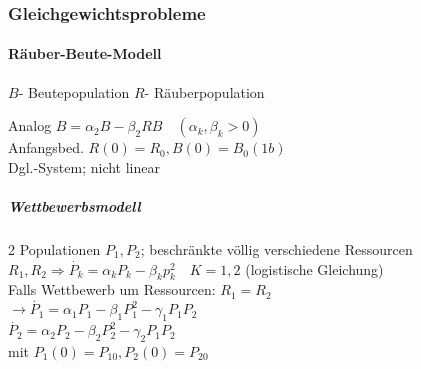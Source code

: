 \documentclass[a4paper]{scrartcl}
\begin{document}
\subsubsection{Gleichgewichtsprobleme}
\paragraph{Räuber-Beute-Modell}
$B$- Beutepopulation
$R$- Räuberpopulation


Analog $B= \alpha_2 B - \beta_2 RB  \quad (\alpha_k,\beta_k > 0)$\\
Anfangsbed. $R(0) = R_0 , B(0) = B_0 (1b)$\\
Dgl.-System; nicht linear
\subparagraph{Wettbewerbsmodell}
2 Populationen $P_1,P_2$; beschränkte völlig verschiedene Ressourcen $R_1,R_2 \Rightarrow \dot{P_k} = \alpha_k P_k - \beta_k p_k^2 \quad K=1,2$ (logistische Gleichung)\\
Falls Wettbewerb um Ressourcen: $R_1 = R_2$\\
$\rightarrow \dot{P_1} = \alpha_1 P_1 - \beta_1 P_1^2 - \gamma_1 P_1 P_2$\\
$\dot{P_2} = \alpha_2 P_2 - \beta_2 P_2^2 - \gamma_2 P_1 P_2$\\
mit $P_1(0) = P_{10} , P_2(0) = P_{20}$
\end{document}

